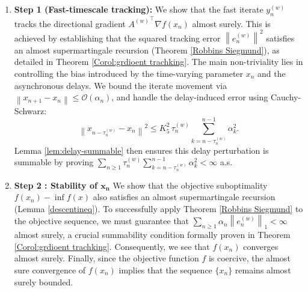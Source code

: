 \documentclass{article}
\newcommand{\norm}[1]{\left\lVert #1 \right\rVert}
\begin{document}
\begin{enumerate}
    \item \textbf{Step 1 (Fast-timescale tracking):} We show that the fast iterate $y_n^{(w)}$ tracks the directional gradient ${A^{(w)}}^\top \nabla f(x_n)$ almost surely. This is achieved by establishing that the squared tracking error $\norm{e_n^{(w)}}^2$ satisfies an almost supermartingale recursion (Theorem \ref{Robbins Siegmund}), as detailed in Theorem \ref{Corol:grdioent trachking}. The main non-triviality lies in controlling the bias introduced by the time-varying parameter $x_n$ and the asynchronous delays. We bound the iterate movement via $\norm{x_{n+1} - x_n} \leq \mathcal{O}(\alpha_n)$, and handle the delay-induced error using Cauchy-Schwarz:
    \begin{equation*}
        \norm{x_{n-\tau_n^{(w)}} - x_n}^2 \le K_5^2 \, \tau_n^{(w)} \sum_{k=n-\tau_n^{(w)}}^{n-1} \alpha_k^2.
    \end{equation*}
    Lemma \ref{lem:delay-summable} then ensures this delay perturbation is summable by proving $\sum_{n \ge 1} \tau_n^{(w)} \sum_{k=n-\tau_n^{(w)}}^{n-1} \alpha_k^2 < \infty$ a.s.

    \item \textbf{Step 2 : Stability of $\mathbf{x_n}$} We show that the objective suboptimality $f(x_n) - \inf f(x)$ also satisfies an almost supermartingale recursion (Lemma \ref{descentineq}). To successfully apply Theorem \ref{Robbins Siegmund} to the objective sequence, we must guarantee that $\sum_{n \ge 1} \alpha_n \norm{e_n^{(w)}}_1 < \infty$ almost surely, a crucial summability condition formally proven in Theorem \ref{Corol:grdioent trachking}. Consequently, we see that $f(x_n)$
converges almost surely.
Finally, since the objective function $f$ is coercive, the almost sure convergence of $f(x_n)$ implies that the sequence $\{x_n\}$ remains almost surely bounded.
\end{enumerate}
\end{document}
